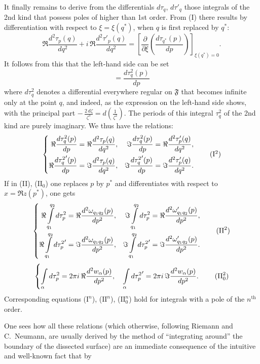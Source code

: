 \documentclass{article}
\begin{document}
It finally remains to derive from the differentials $d\tau_q$, $d\tau'_q$ those integrals of the 2nd kind that possess poles of higher than 1st order. From (I) there results by differentiation with respect to $\xi = \xi(q^*)$, when $q$ is first replaced by $q^*$:
\[ \Re \frac{d^2\tau_p(q)}{dq^2} + i\,\Re \frac{d^2\tau'_p(q)}{dq^2} = \left[ \frac{\partial}{\partial\xi} \left( \frac{d\tau_{q^*}(p)}{dp} \right) \right]_{\xi(q^*) = 0}. \]
It follows from this that the left-hand side can be set
\[ = \frac{d\tau_q^2(p)}{dp} \]
where $d\tau_q^2$ denotes a differential everywhere regular on $\mathfrak{F}$ that becomes infinite only at the point $q$, and indeed, as the expression on the left-hand side shows, with the principal part $-\,\frac{2\,d\zeta}{\zeta^3} = d\left(\frac{1}{\zeta^2}\right)$. The periods of this integral $\tau_q^2$ of the 2nd kind are purely imaginary. We thus have the relations:
\[ \left\{ \begin{aligned}
\Re \frac{d\tau_q^2(p)}{dp} &= \Re \frac{d^2\tau_p(q)}{dq^2}, & \Im \frac{d\tau_q^2(p)}{dp} &= \Re \frac{d^2\tau'_p(q)}{dq^2}, \\
\Re \frac{d{\tau_q^2}'(p)}{dp} &= \Im \frac{d^2\tau_p(q)}{dq^2}, & \Im \frac{d{\tau_q^2}'(p)}{dp} &= \Im \frac{d^2\tau'_p(q)}{dq^2}.
\end{aligned} \right. \tag{$\mathrm{I}^2$} \]
If in (II), ($\mathrm{II}_0$) one replaces $p$ by $p^*$ and differentiates with respect to $x = \Re z(p^*)$, one gets
\[ \left\{ \begin{aligned}
\Re \int\limits_{q_1}^{q_2} d\tau_p^2 &= \Re \frac{d^2\omega_{q_1 q_2}(p)}{dp^2}, & \Im \int\limits_{q_1}^{q_2} d\tau_p^2 &= \Re \frac{d^2\omega'_{q_1 q_2}(p)}{dp^2}, \\
\Re \int\limits_{q_1}^{q_2} d{\tau_p^2}' &= \Im \frac{d^2\omega_{q_1 q_2}(p)}{dp^2}, & \Im \int\limits_{q_1}^{q_2} d{\tau_p^2}' &= \Im \frac{d^2\omega'_{q_1 q_2}(p)}{dp^2}.
\end{aligned} \right. \tag{$\mathrm{II}^2$} \]
\[ \left\{ \int\limits_\alpha d\tau_p^2 = 2\pi i\,\Re \frac{d^2 w_\alpha(p)}{dp^2}, \quad \int\limits_\alpha d{\tau_p^2}' = 2\pi i\,\Im \frac{d^2 w_\alpha(p)}{dp^2}. \right. \tag{$\mathrm{II}_0^2$} \]
Corresponding equations ($\mathrm{I}^n$), ($\mathrm{II}^n$), ($\mathrm{II}_0^n$) hold for integrals with a pole of the $n^{\text{th}}$ order.

One sees how all these relations (which otherwise, following Riemann and C.~Neumann, are usually derived by the method of ``integrating around'' the boundary of the dissected surface) are an immediate consequence of the intuitive and well-known fact that by
\end{document}
